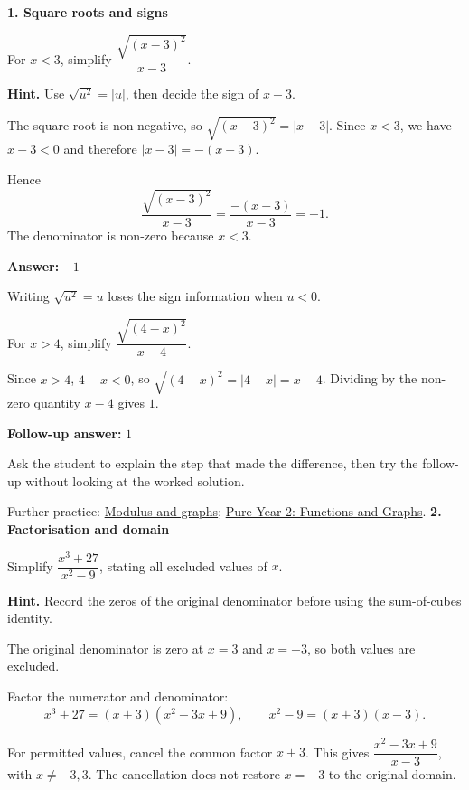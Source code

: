 \documentclass[11pt,a4paper]{article}
\newcommand{\smallheading}[1]{\par\vspace{9pt}{\large\bfseries #1}\par\vspace{1pt}}
\begin{document}
{\LARGE\bfseries 1. Square roots and signs}\par
\smallheading{Diagnostic question}
For \(x<3\), simplify \(\dfrac{\sqrt{(x-3)^2}}{x-3}\).\par
\textbf{Hint.} Use \(\sqrt{u^2}=|u|\), then decide the sign of \(x-3\).\par
\smallheading{Worked solution}
The square root is non-negative, so \(\sqrt{(x-3)^2}=|x-3|\). Since \(x<3\), we have \(x-3<0\) and therefore \(|x-3|=-(x-3)\).

Hence \[\frac{\sqrt{(x-3)^2}}{x-3}=\frac{-(x-3)}{x-3}=-1.\] The denominator is non-zero because \(x<3\).

\textbf{Answer:} \(-1\)\par
\smallheading{What to notice}
Writing \(\sqrt{u^2}=u\) loses the sign information when \(u<0\).\par
\smallheading{Matched follow-up}
For \(x>4\), simplify \(\dfrac{\sqrt{(4-x)^2}}{x-4}\).\par
Since \(x>4\), \(4-x<0\), so \(\sqrt{(4-x)^2}=|4-x|=x-4\). Dividing by the non-zero quantity \(x-4\) gives \(1\).

\textbf{Follow-up answer:} \(1\)\par
\vfill\smallheading{Teaching note}
Ask the student to explain the step that made the difference, then try the follow-up without looking at the worked solution.\par
{\small Further practice: \href{https://maths.arijasad.com/modulus-and-graphs.html}{Modulus and graphs}; \href{https://maths.arijasad.com/edexcel-pure-year-2.html#chapter-2}{Pure Year 2: Functions and Graphs}.}
\newpage
{\LARGE\bfseries 2. Factorisation and domain}\par
\smallheading{Diagnostic question}
Simplify \(\dfrac{x^3+27}{x^2-9}\), stating all excluded values of \(x\).\par
\textbf{Hint.} Record the zeros of the original denominator before using the sum-of-cubes identity.\par
\smallheading{Worked solution}
The original denominator is zero at \(x=3\) and \(x=-3\), so both values are excluded.

Factor the numerator and denominator: \[x^3+27=(x+3)(x^2-3x+9),\qquad x^2-9=(x+3)(x-3).\]

For permitted values, cancel the common factor \(x+3\). This gives \(\dfrac{x^2-3x+9}{x-3}\), with \(x\ne -3,3\). The cancellation does not restore \(x=-3\) to the original domain.
\end{document}
